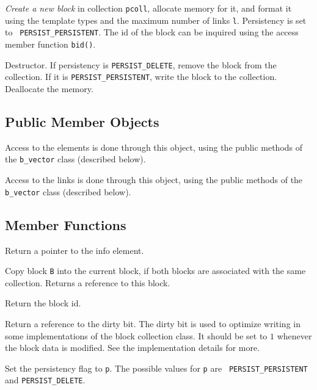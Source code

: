 	 {{\em
	Create a new block} in collection {\tt *pcoll}, allocate memory for
	it, and format it using the template types and the maximum number
	of links {\tt l}. Persistency is set to {\tt
	PERSIST\_PERSISTENT}. The id of the block can be inquired using the
	access member function {\tt bid()}.}

	 {Destructor. If persistency 
	is {\tt PERSIST\_DELETE}, remove the block from the collection. 
	If it is {\tt PERSIST\_PERSISTENT}, write the block to the 
	collection. Deallocate the memory.}

   \etabb

\subsection{Public Member Objects}

   \btabb

	 {Access to the elements is done through
	this object, using the public methods of the {\tt b\_vector} class
	(described below).}

	 {Access to the links is done
	through this object, using the public methods of the {\tt
	b\_vector} class (described below).}

   \etabb

\subsection{Member Functions}

   \btabb
	
	 {Return a pointer to the info element.}

	 {Copy
	block {\tt B} into the current block, if both blocks are associated
	with the same collection. Returns a reference to this block.}

	 {Return the block id.}

	 {Return a reference to the dirty bit. The
	dirty bit is used to optimize writing in some implementations of
	the block collection class. It should be set to $1$ whenever the
	block data is modified. See the implementation details for more.}

	 {Set the persistency flag to
	{\tt p}. The possible values for {\tt p} are {\tt
	PERSIST\_PERSISTENT} and {\tt PERSIST\_DELETE}.}

